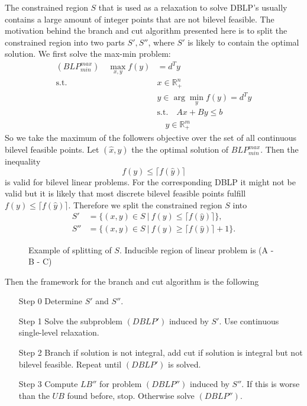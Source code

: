 \documentclass{article}
\begin{document}
The constrained region $S$ that is used as a relaxation to solve DBLP's usually contains a large amount of integer points that are not bilevel feasible. The motivation behind the branch and cut algorithm presented here is to split the constrained region into two parts $S',S''$, where $S'$ is likely to contain the optimal solution.
We first solve the max-min problem:
	\begin{align*}
	(BLP^{max}_{min}) \quad \max_{x,y} f(y) &= d^T y \\
	\text{s.t.} \quad &x \in \mathbb{R}^n_{+} \\
	&y \in \arg \min_{y} f(y) = d^Ty \\
	&\text{s.t.} \quad Ax + By \le b \\
	& \quad y \in \mathbb{R}^m_{+}
	\end{align*}
So we take the maximum of the followers objective over the set of all continuous bilevel feasible points. Let $(\hat x, \hat y)$ the the optimal solution of $BLP^{max}_{min}$. Then the inequality
\begin{equation*}
	f(y) \le \lceil f(\hat y) \rceil
\end{equation*}
is valid for bilevel linear problems. For the corresponding DBLP it might not be valid but it is likely that most discrete bilevel feasible points fulfill $f(y) \le \lceil f(\hat y) \rceil$.
Therefore we split the constrained region $S$ into 
\begin{align*}
	S' &= \{(x,y) \in S \ | \ f(y) \le \lceil f(\hat y) \rceil \}, \\
	S'' &= \{(x,y) \in S \ | \ f(y) \ge \lceil f(\hat y) \rceil + 1\}.
\end{align*}
	\begin{figure}
		\centering
		
		\caption{Example of splitting of $S$. Inducible region of linear problem is (A - B - C)}
	\end{figure}
Then the framework for the branch and cut algorithm is the following
	\begin{itemize}
		\item[Step 0]Determine $S'$ and $S''$.
		\item[Step 1]Solve the subproblem $(DBLP')$ induced by $S'$. Use continuous single-level relaxation. 
		\item[Step 2]Branch if solution is not integral, add cut if solution is integral but not bilevel feasible. Repeat until $(DBLP')$ is solved.
		\item[Step 3]Compute $LB''$ for problem $(DBLP'')$ induced by $S''$. If this is worse than the $UB$ found before, stop.
		Otherwise solve $(DBLP'')$.
	\end{itemize}
\end{document}

